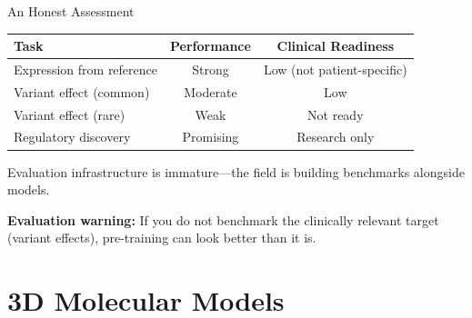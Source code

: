 \documentclass[aspectratio=169,10pt]{beamer}
\begin{document}


\begin{frame}{An Honest Assessment}
\begin{center}
\renewcommand{\arraystretch}{1.15}
{\small
\begin{tabular}{lcc}
\toprule
\textbf{Task} & \textbf{Performance} & \textbf{Clinical Readiness} \\
\midrule
Expression from reference & Strong & Low (not patient-specific) \\
Variant effect (common) & Moderate & Low \\
Variant effect (rare) & Weak & Not ready \\
Regulatory discovery & Promising & Research only \\
\bottomrule
\end{tabular}}
\end{center}
\vspace{0.2em}
Evaluation infrastructure is immature---the field is building benchmarks alongside models.
\vspace{0.2em}

\textbf{Evaluation warning:} If you do not benchmark the clinically relevant target (variant effects), pre-training can look better than it is.
\end{frame}

\section{3D Molecular Models}
\end{document}
